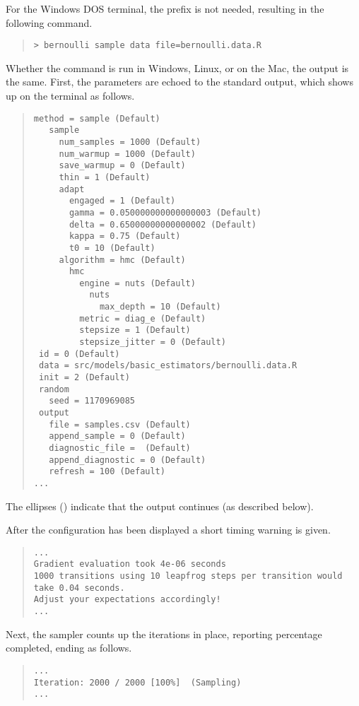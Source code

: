 For the Windows DOS terminal, the  prefix is not needed,
resulting in the following command.
%
\begin{quote}
\begin{Verbatim}[fontshape=sl]
> bernoulli sample data file=bernoulli.data.R
\end{Verbatim}
\end{quote}
%
Whether the command is run in Windows, Linux, or on the Mac, the
output is the same.  First, the parameters are echoed to the standard output,
which shows up on the terminal as follows.
%
\begin{quote}
\begin{Verbatim}[fontsize=\small]
 method = sample (Default)
   sample
     num_samples = 1000 (Default)
     num_warmup = 1000 (Default)
     save_warmup = 0 (Default)
     thin = 1 (Default)
     adapt
       engaged = 1 (Default)
       gamma = 0.050000000000000003 (Default)
       delta = 0.65000000000000002 (Default)
       kappa = 0.75 (Default)
       t0 = 10 (Default)
     algorithm = hmc (Default)
       hmc
         engine = nuts (Default)
           nuts
             max_depth = 10 (Default)
         metric = diag_e (Default)
         stepsize = 1 (Default)
         stepsize_jitter = 0 (Default)
 id = 0 (Default)
 data = src/models/basic_estimators/bernoulli.data.R
 init = 2 (Default)
 random
   seed = 1170969085
 output
   file = samples.csv (Default)
   append_sample = 0 (Default)
   diagnostic_file =  (Default)
   append_diagnostic = 0 (Default)
   refresh = 100 (Default)
...
\end{Verbatim}
\end{quote}
%
The ellipses () indicate that the output continues (as
described below).

After the configuration has been displayed a short timing warning
is given.
%
\begin{quote}
\begin{Verbatim}[fontsize=\small]
...
Gradient evaluation took 4e-06 seconds
1000 transitions using 10 leapfrog steps per transition would take 0.04 seconds.
Adjust your expectations accordingly!
...
\end{Verbatim}
\end{quote}


Next, the sampler counts up the iterations in place, reporting
percentage completed, ending as follows.
%
\begin{quote}
\begin{Verbatim}[fontsize=\small]
...
Iteration: 2000 / 2000 [100%]  (Sampling)
...
\end{Verbatim}
\end{quote}

